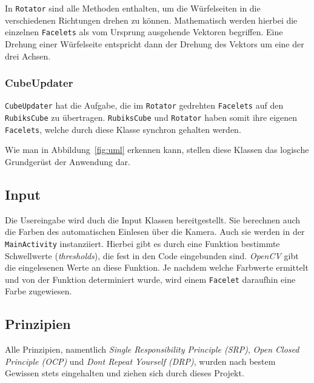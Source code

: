 In \texttt{Rotator} sind alle Methoden enthalten, um die Würfelseiten in die
verschiedenen Richtungen drehen zu können. Mathematisch werden hierbei die
einzelnen \texttt{Facelets} als vom Ursprung ausgehende Vektoren begriffen. Eine Drehung
einer Würfelseite entspricht dann der Drehung des Vektors um eine der drei
Achsen.


\subsubsection{CubeUpdater}

\texttt{CubeUpdater} hat die Aufgabe, die im \texttt{Rotator} gedrehten \texttt{Facelets} auf den
\texttt{RubiksCube} zu übertragen. \texttt{RubiksCube} und \texttt{Rotator} haben somit ihre eigenen
\texttt{Facelets}, welche durch diese Klasse synchron gehalten werden.


Wie man in Abbildung~\ref{fig:uml} erkennen kann, stellen diese Klassen das
logische Grundgerüst der Anwendung dar. 



\subsection{Input}

Die Usereingabe wird duch die Input Klassen bereitgestellt. Sie berechnen auch
die Farben des automatischen Einlesen über die Kamera. Auch sie werden in der
\texttt{MainActivity} instanziiert. Hierbei gibt es durch eine Funktion bestimmte
Schwellwerte (\emph{thresholds}), die fest in den Code eingebunden sind. \emph{OpenCV}
gibt die eingelesenen Werte an diese Funktion. Je nachdem welche Farbwerte ermittelt
und von der Funktion determiniert wurde, wird einem \texttt{Facelet} daraufhin eine
Farbe zugewiesen.



\subsection{Prinzipien}  %
Alle Prinzipien, namentlich \emph{Single Responsibility Principle (SRP)}, \emph{Open Closed
Principle (OCP)} und \emph{Dont Repeat Yourself (DRP)}, wurden nach bestem Gewissen stets
eingehalten und ziehen sich durch dieses Projekt.

